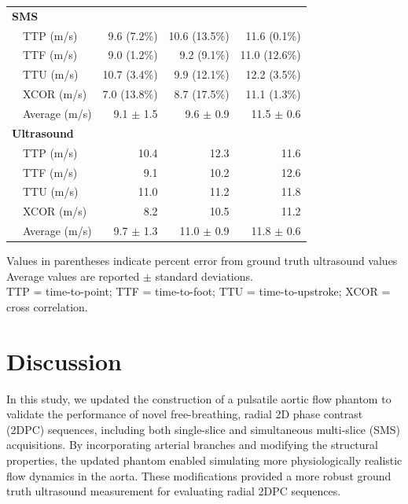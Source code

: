 \begin{table}[ht]
\begin{tabularx}{\textwidth}{llrrr}
    \midrule
    \multicolumn{5}{l}{\textbf{SMS}} \\

    & TTP (m/s)  & 9.6 (\phantom{0}7.2\%) & 10.6 (13.5\%) & 11.6 (\phantom{0}0.1\%)\\
    & TTF (m/s)  & 9.0 (\phantom{0}1.2\%) & 9.2 (\phantom{0}9.1\%) & 11.0 (12.6\%) \\
    & TTU (m/s)  & 10.7 (\phantom{0}3.4\%) & 9.9 (12.1\%) & 12.2 (3.5\%) \\
    & XCOR (m/s) & 7.0 (13.8\%) & 8.7 (17.5\%) & 11.1 (\phantom{0}1.3\%) \\
    & Average (m/s) & 9.1\phantom{0} $\pm$ \phantom{0}1.5 & 9.6\phantom{0} $\pm$ \phantom{0}0.9 & 11.5\phantom{0} $\pm$ \phantom{0}0.6 \\

    \midrule
    \multicolumn{5}{l}{\textbf{Ultrasound}} \\

    & TTP (m/s)  & 10.4 \phantom{(00.0\%)} & 12.3 \phantom{(00.0\%)} & 11.6 \phantom{(00.0\%)} \\
    & TTF (m/s)  & 9.1 \phantom{(00.0\%)} & 10.2 \phantom{(00.0\%)} & 12.6 \phantom{(00.0\%)} \\
    & TTU (m/s)  & 11.0 \phantom{(00.0\%)} & 11.2 \phantom{(00.0\%)} & 11.8 \phantom{(00.0\%)} \\
    & XCOR (m/s) & 8.2 \phantom{(00.0\%)} & 10.5 \phantom{(00.0\%)} & 11.2 \phantom{(00.0\%)} \\
    & Average (m/s) & 9.7\phantom{0} $\pm$ \phantom{0}1.3 & 11.0\phantom{0} $\pm$ \phantom{0}0.9 & 11.8\phantom{0} $\pm$ \phantom{0}0.6 \\

    \bottomrule
    \end{tabularx}
    \begin{flushleft}
        \footnotesize
        Values in parentheses indicate percent error from ground truth ultrasound values \\
        Average values are reported $\pm$ standard deviations. \\
        TTP = time-to-point; TTF = time-to-foot; TTU = time-to-upstroke; XCOR = cross correlation.
    \end{flushleft}
\end{table}

\section{Discussion}\label{sec:phantom_discussion}
In this study, we updated the construction of a pulsatile aortic flow phantom to validate the performance of novel free-breathing, radial 2D phase contrast (2DPC) sequences, including both single-slice and simultaneous multi-slice (SMS) acquisitions. By incorporating arterial branches and modifying the structural properties, the updated phantom enabled simulating more physiologically realistic flow dynamics in the aorta. These modifications provided a more robust ground truth ultrasound measurement for evaluating radial 2DPC sequences.

